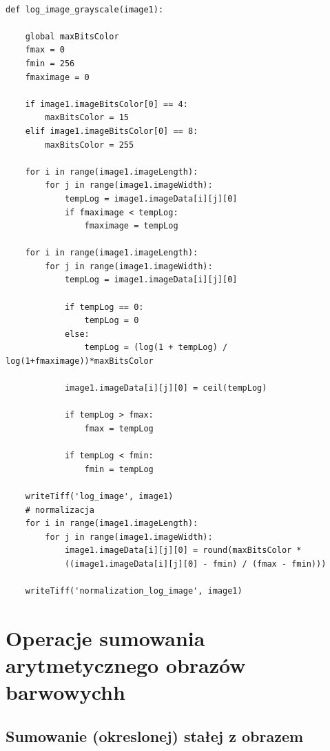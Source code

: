 \documentclass[magisterska,openany]{pracadypl}
\begin{document}
\lstset{language=Python}
\vspace{0.25cm}
\begin{lstlisting}[caption={Logarytmowanie obrazu}]

def log_image_grayscale(image1):

    global maxBitsColor
    fmax = 0
    fmin = 256
    fmaximage = 0

    if image1.imageBitsColor[0] == 4:
        maxBitsColor = 15
    elif image1.imageBitsColor[0] == 8:
        maxBitsColor = 255

    for i in range(image1.imageLength):
        for j in range(image1.imageWidth):
            tempLog = image1.imageData[i][j][0]
            if fmaximage < tempLog:
                fmaximage = tempLog

    for i in range(image1.imageLength):
        for j in range(image1.imageWidth):
            tempLog = image1.imageData[i][j][0]

            if tempLog == 0:
                tempLog = 0
            else:
                tempLog = (log(1 + tempLog) / log(1+fmaximage))*maxBitsColor

            image1.imageData[i][j][0] = ceil(tempLog)

            if tempLog > fmax:
                fmax = tempLog

            if tempLog < fmin:
                fmin = tempLog

    writeTiff('log_image', image1)
    # normalizacja
    for i in range(image1.imageLength):
        for j in range(image1.imageWidth):
            image1.imageData[i][j][0] = round(maxBitsColor * 
            ((image1.imageData[i][j][0] - fmin) / (fmax - fmin)))

    writeTiff('normalization_log_image', image1)

\end{lstlisting}




\chapter{Operacje sumowania arytmetycznego obrazów barwowychh}
\section{Sumowanie (okreslonej) stałej z obrazem}
\end{document}
